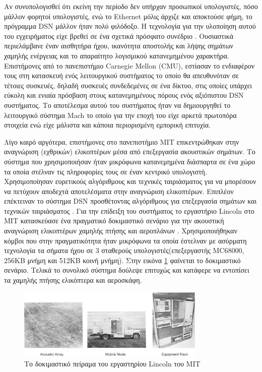Αν συνυπολογισθεί ότι εκείνη την περίοδο δεν υπήρχαν προσωπικοί υπολογιστές, πόσο μάλλον φορητοί υπολογιστές, ενώ το Ethernet μόλις άρχιζε και αποκτούσε φήμη, το
πρόγραμμα DSN μάλλον ήταν πολύ φιλόδοξο.
Η τεχνολογία για την υλοποίηση αυτού του εγχειρήματος είχε βρεθεί σε ένα σχετικά πρόσφατο συνέδριο \cite{1978DSN}.
Ουσιαστικά περιελάμβανε έναν αισθητήρα ήχου, ικανότητα αποστολής και λήψης σημάτων χαμηλής ενέργειας και το απαραίτητο λογισμικού κατανεμημένου χαρακτήρα.
Επιστήμονες από το πανεπιστήμιο Carnegie Mellon (CMU), εστίασαν το ενδιαφέρον τους στη κατασκευή ενός λειτουργικού συστήματος το οποίο θα απευθυνόταν σε τέτοιες
συσκευές, δηλαδή συσκευές συνδεδεμένες σε ένα δίκτυο, στις οποίες υπάρχει εύκολη και ενιαία πρόσβαση στους κατανεμημένους πόρους ενός αξιόπιστου DSN συστήματος.
Το αποτέλεσμα αυτού του συστήματος ήταν να δημιουργηθεί το λειτουργικό σύστημα Mach το οποίο για την εποχή του είχε αρκετά πρωτοπόρα στοιχεία \cite{Mach} ενώ είχε
μάλιστα και κάποια περιορισμένη εμπορική επιτυχία.

Λίγο καιρό αργότερα, επιστήμονες στο πανεπιστήμιο MIT επικεντρώθηκαν στην αναγνώριση (εχθρικών) ελικοπτέρων μέσα από επεξεργασία ακουστικών σημάτων.
Το σύστημα που χρησιμοποιήσαν ήταν μικρόφωνα κατανεμημένα διάσπαρτα σε ένα χώρο τα οποία στέλναν τις πληροφορίες τους σε έναν κεντρικό υπολογιστή.
Χρησιμοποίησαν ευρετικούς αλγόριθμους και τεχνικές ταιριάσματος για να μπορέσουν να πετύχουν αποδεχτά αποτελέσματα στην αναγνώριση ελικοπτέρων.
Επιπλέον επέκτειναν το σύστημα DSN προσθέτοντας αλγόριθμους για επεξεργασία σημάτων και τεχνικών ταιριάσματος \cite{4789229}.
Για την επίδειξη του συστήματος το εργαστήριο Lincoln στο MIT κατασκεύασε ένα πραγματικό δοκιμαστικό σενάριο για την ακουστική αναγνώριση ελικοπτέρων χαμηλής πτήσης
και αεροπλάνων \cite{aircraft}.
Χρησιμοποιήθηκαν κόμβοι που στην πραγματικότητα ήταν μικρόφωνα τα οποία έστελναν με ασύρματη τεχνολογία τα σήματα ήχου σε 3 σταθερούς υπολογιστές(επεξεργαστής
MC68000, 256KB μνήμη και 512ΚΒ κοινή μνήμη).
Στην εικόνα \ref{fig:lincoln_lab} \cite{lincoln_report} φαίνεται το δοκιμαστικό σενάριο.
Τελικά το συνολικό σύστημα δούλεψε επιτυχώς και κατάφερε να εντοπίσει τα χαμηλής πτήσης ελικόπτερα και αεροσκάφη.
\begin{figure}[h]
	\centering
	\includegraphics[width=0.8\textwidth]{images/lincoln_lab.eps}
	\caption{Tο δοκιμαστικό πείραμα του εργαστηρίου Lincoln του MIT}
	\label{fig:lincoln_lab}
\end{figure}

